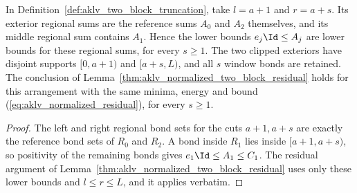 \begin{lemma}
    \label{thm:aklv_normalized_reference_residual}
    \leanok
    In Definition~\ref{def:aklv_two_block_truncation}, take $l=a+1$ and
    $r=a+s$. Its exterior regional sums are the reference sums $A_0$ and
    $A_2$ themselves, and its middle regional sum contains $A_1$. Hence the
    lower bounds $e_j\Id\le A_j$ are lower bounds for these regional sums,
    for every $s\ge1$. The two clipped exteriors have disjoint supports
    $[0,a+1)$ and $[a+s,L)$, and all $s$ window bonds are retained.
    The conclusion of Lemma~\ref{thm:aklv_normalized_two_block_residual}
    holds for this arrangement with the same minima, energy and bound
    (\ref{eq:aklv_normalized_residual}), for every $s\ge1$.
\end{lemma}
\begin{proof}
    \leanok
    The left and right regional bond sets for the cuts $a+1,a+s$ are
    exactly the reference bond sets of $R_0$ and $R_2$. A bond inside
    $R_1$ lies inside $[a+1,a+s)$, so positivity of the remaining bonds gives
    $e_1\Id\le A_1\le C_1$. The residual argument of
    Lemma~\ref{thm:aklv_normalized_two_block_residual} uses only these
    lower bounds and $l\le r\le L$, and it applies verbatim.
\end{proof}

